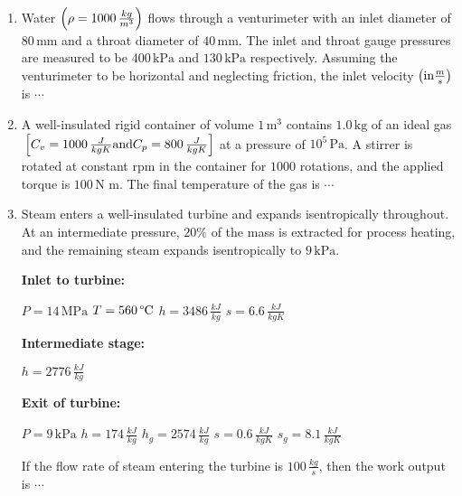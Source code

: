 \documentclass[journal,12pt,twocolumn]{IEEEtran}
\theoremstyle{remark}
\begin{document}
\begin{enumerate}[start=53]
  \item Water $\left(\rho = 1000 \, \frac{kg}{m^3}\right)$ flows through a venturimeter with an inlet diameter of $80 \, \text{mm}$ and a throat diameter of $40 \, \text{mm}$. The inlet and throat gauge pressures are measured to be $400 \, \text{kPa}$ and $130 \, \text{kPa}$ respectively. Assuming the venturimeter to be horizontal and neglecting friction, the inlet velocity $\left(\text{in} \frac{m}{s}\right)$ is $\cdots$

 \item A well-insulated rigid container of volume $1 \, \text{m}^3$ contains $1.0 \, \text{kg}$ of an ideal gas ${}\left[C_v = 1000 \, \frac{J}{kgK} \text{and} C_p = 800 \, \frac{J}{kgK}\right]$ at a pressure of $10^5 \, \text{Pa}$. A stirrer is rotated at constant rpm in the container for $1000$ rotations, and the applied torque is $100 \, \text{N m}$. The final temperature of the gas  is $\cdots$

\item Steam enters a well-insulated turbine and expands isentropically throughout. At an intermediate pressure, $20\%$ of the mass is extracted for process heating, and the remaining steam expands isentropically to $9 \, \text{kPa}$.
    
    \textbf{Inlet to turbine:} 

         $P = 14 \, \text{MPa}$
         $T = 560 \, \text{\degree C}$
         $h = 3486 \, \frac{kJ}{kg}$
         $s = 6.6 \, \frac{kJ}{kgK}$

    
    \textbf{Intermediate stage:} 
    
        $h = 2776 \, \frac{kJ}{kg}$
    
    
    \textbf{Exit of turbine:} 
    
         $P = 9 \, \text{kPa}$
         $h = 174 \, \frac{kJ}{kg}$
        $h_g = 2574 \, \frac{kJ}{kg}$
         $s = 0.6 \, \frac{kJ}{kgK}$
         $s_g = 8.1 \, \frac{kJ}{kgK}$
   
    
    If the flow rate of steam entering the turbine is $100 \, \frac{kg}{s}$, then the work output  is $\cdots$

 
 
\end{enumerate}
\end{document}
